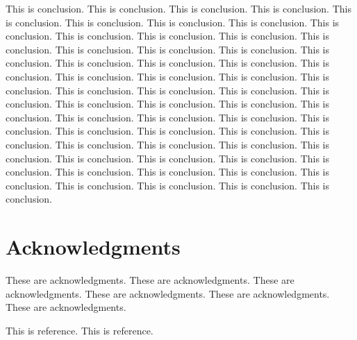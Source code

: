 \documentclass[hyperref]{ctexart}
\begin{document}
\begin{multicols}{2}
	This is conclusion.
	This is conclusion.
	This is conclusion.
	This is conclusion.
	This is conclusion.
	This is conclusion.
	This is conclusion.
	This is conclusion.
	This is conclusion.
	This is conclusion.
	This is conclusion.
	This is conclusion.
	This is conclusion.
	This is conclusion.
	This is conclusion.
	This is conclusion.
	This is conclusion.
	This is conclusion.
	This is conclusion.
	This is conclusion.
	This is conclusion.
	This is conclusion.
	This is conclusion.
	This is conclusion.
	This is conclusion.
	This is conclusion.
	This is conclusion.
	This is conclusion.
	This is conclusion.
	This is conclusion.
	This is conclusion.
	This is conclusion.
	This is conclusion.
	This is conclusion.
	This is conclusion.
	This is conclusion.
	This is conclusion.
	This is conclusion.
	This is conclusion.
	This is conclusion.
	This is conclusion.
	This is conclusion.
	This is conclusion.
	This is conclusion.
	This is conclusion.
	This is conclusion.
	This is conclusion.
	This is conclusion.
	This is conclusion.
	This is conclusion.
	This is conclusion.
	This is conclusion.
	This is conclusion.
	This is conclusion.
	This is conclusion.
	This is conclusion.
	This is conclusion.
	\section*{Acknowledgments}
	 These are acknowledgments. These are acknowledgments. These are acknowledgments. These are acknowledgments. These are acknowledgments. These are acknowledgments.
	\begin{thebibliography}{100}%
		This is reference.%
		This is reference.%
	\end{thebibliography}
	\end{multicols}
\end{document}
